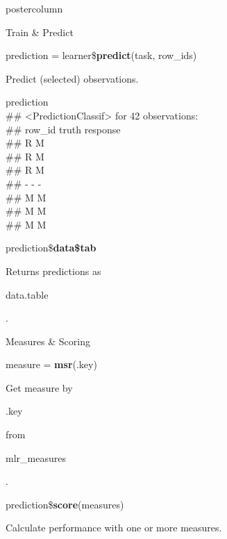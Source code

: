 \documentclass{beamer}
\newcommand{\codeinline}[1]{\begin{codeboxinline}#1\end{codeboxinline}}
\begin{document}
\begin{frame}[fragile]{}
\begin{columns}
\begin{column}{.245\textwidth}
\begin{beamercolorbox}[center]{postercolumn}
\begin{minipage}{.98\textwidth}
{\begin{myblock}{Train \& Predict}
\begin{codebox}
								prediction = learner\$\textbf{predict}(task, row\_ids)
							\end{codebox}
	                        Predict (selected) observations.
	                        \\
	                        \begin{codeboxmultiline}[width=23cm]
								{\footnotesize prediction\\
								\#\# <PredictionClassif> for 42 observations:\\
								\#\# row\_id truth response\\
								\#\# \space\space\space\space\space 2
								\space\space\space\space R \space\space\space\space\space\space\space M\\
								\#\# \space\space\space\space\space 3
								\space\space\space\space R \space\space\space\space\space\space\space M\\
								\#\# \space\space\space\space\space 5
								\space\space\space\space R \space\space\space\space\space\space\space M\\
								\#\# - - -\\
								\#\# \space\space\space 198
								\space\space\space\space M \space\space\space\space\space\space\space M\\
								\#\# \space\space{}00
								\space\space\space\space M \space\space\space\space\space\space\space M\\
								\#\# \space\space\space 207
								\space\space\space\space M \space\space\space\space\space\space\space M}
	                        \end{codeboxmultiline}
							\vspace{1em}
							\begin{codebox}
								prediction\$\textbf{data\$tab}
							\end{codebox}
							Returns predictions as \codeinline{data.table}.
	                    \end{myblock}
	                    \begin{myblock}{Measures \& Scoring}
							\begin{codebox}
								measure = \textbf{msr}(.key)
							\end{codebox}
							Get measure by \codeinline{.key} from \codeinline{mlr\_measures}.
							\\
							\begin{codebox}
								prediction\$\textbf{score}(measures)
							\end{codebox}
							Calculate performance with one or more measures.
						\end{myblock}
					\vfill}
				\end{minipage}
			\end{beamercolorbox}
		\end{column}
	\end{columns}
\end{frame}
\end{document}
